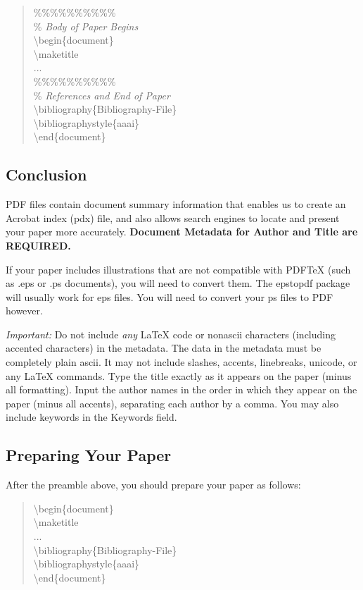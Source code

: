 \documentclass[letterpaper]{article}
\begin{document}
\begin{quote}
\begin{small}
			\%\%\%\%\%\%\%\%\%\%\\
			\% \textit{Body of Paper Begins}\\
			\textbackslash begin\{document\}\\
			\textbackslash maketitle\\
			...\\
			\%\%\%\%\%\%\%\%\%\%\\
			\% \textit{References and End of Paper}\\
			\textbackslash bibliography\{Bibliography-File\}\\
			\textbackslash bibliographystyle\{aaai\}\\
			\textbackslash end\{document\}
		\end{small}
	\end{quote}
	
	\subsection{Conclusion}
	PDF files contain document summary information that enables us to create an Acrobat index (pdx) file, and also allows search engines to locate and present your paper more accurately. \textbf{Document Metadata  for Author and Title are REQUIRED.} 
	
	If your paper includes illustrations that are not compatible with PDF\TeX{} (such as .eps or .ps documents), you will need to convert them. The epstopdf package will usually work for eps files. You will need to convert your ps files to PDF however.
	
	\textit{Important:} Do not include \textit{any} \LaTeX{} code or nonascii characters (including accented characters) in the metadata. The data in the metadata must be completely plain ascii. It may not include slashes, accents, linebreaks, unicode, or any \LaTeX{} commands. Type the title exactly as it appears on the paper (minus all formatting). Input the author names in the order in which they appear on the paper (minus all accents), separating each author by a comma. You may also include keywords in the Keywords field.
	
	
	
	\subsection{Preparing Your Paper}
	
	After the preamble above, you should prepare your paper as follows:
	
	\begin{quote}
		\begin{small}
			\textbackslash begin\{document\}\\
			\textbackslash maketitle\\
			...\\
			\textbackslash bibliography\{Bibliography-File\}\\
			\textbackslash bibliographystyle\{aaai\}\\
			\textbackslash end\{document\}\\
		\end{small}
	\end{quote}
\end{document}
